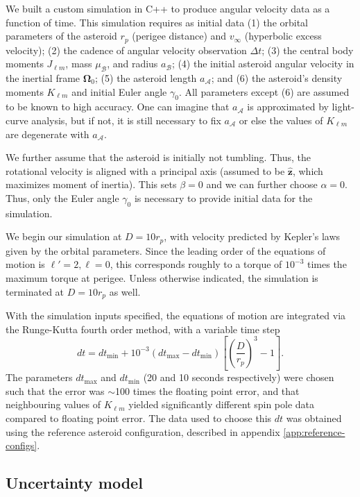 \documentclass[fleqn,usenatbib]{mnras}
\newcommand{\unit}[1]{\bm{\hat{#1}}}
\newcommand{\parens}[1]{\left( #1 \right)}
\newcommand{\brackets}[1]{\left[ #1 \right]}
\begin{document}
We built a custom simulation in C++ to produce angular velocity data as a function of time. This simulation requires as initial data (1) the orbital parameters of the asteroid $r_p$ (perigee distance) and $v_\infty$ (hyperbolic excess velocity); (2) the cadence of angular velocity observation $\Delta t$; (3) the central body moments $J_{\ell m}$, mass $\mu_\mathcal{B}$, and radius $a_\mathcal{B}$; (4) the initial asteroid angular velocity in the inertial frame $\bm \Omega_0$; (5) the asteroid length $a_\mathcal{A}$; and (6) the asteroid's density moments $K_{\ell m}$ and initial Euler angle $\gamma_0$. All parameters except (6) are assumed to be known to high accuracy. One can imagine that $a_\mathcal{A}$ is approximated by light-curve analysis, but if not, it is still necessary to fix $a_\mathcal{A}$ or else the values of $K_{\ell m}$ are degenerate with $a_\mathcal{A}$.

We further assume that the asteroid is initially not tumbling. Thus, the rotational velocity is aligned with a principal axis (assumed to be $\unit z$, which maximizes moment of inertia). This sets $\beta = 0$ and we can further choose $\alpha = 0$. Thus, only the Euler angle $\gamma_0$ is necessary to provide initial data for the simulation.

We begin our simulation at $D = 10 r_p$, with velocity predicted by Kepler's laws given by the orbital parameters. Since the leading order of the equations of motion is $\ell' = 2, \ell = 0$, this corresponds roughly to a torque of $10^{-3}$ times the maximum torque at perigee. Unless otherwise indicated, the simulation is terminated at $D=10 r_p$ as well.

With the simulation inputs specified, the equations of motion are integrated via the Runge-Kutta fourth order method, with a variable time step
\begin{equation}
  dt = dt_\text{min} + 10^{-3}(dt_\text{max} - dt_\text{min}) \brackets{\parens{\frac{D}{r_p}}^3 - 1}.
\end{equation}
The parameters $dt_\text{max}$ and $dt_\text{min}$ (20 and 10 seconds respectively) were chosen such that the error was $\sim$100 times the floating point error, and that neighbouring values of $K_{\ell m}$ yielded significantly different spin pole data compared to floating point error. The data used to choose this $dt$ was obtained using the reference asteroid configuration, described in appendix \ref{app:reference-configs}.



\subsection{Uncertainty model}
\label{sec:uncertainty}
\end{document}
